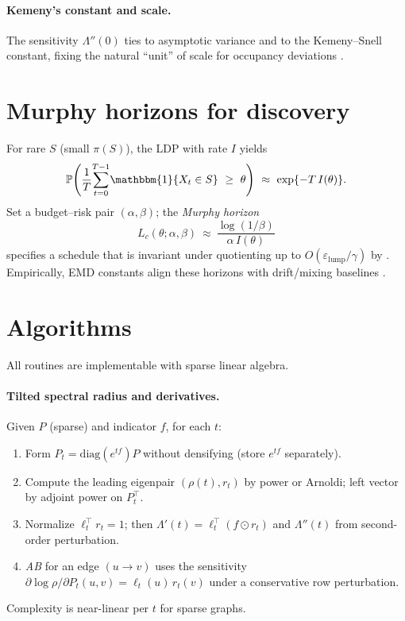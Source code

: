 \documentclass[11pt]{article}
\newcommand{\Prob}{\mathbb{P}}
\newcommand{\1}{\mathbbm{1}}
\begin{document}
\paragraph{Kemeny’s constant and scale.}
The sensitivity $\Lambda''(0)$ ties to asymptotic variance and to the Kemeny–Snell constant, fixing the natural “unit” of scale for occupancy deviations \parencite{KemenySnell1976,LevinPeresWilmer2009}.

\section{Murphy horizons for discovery}\label{sec:murphy}
For rare $S$ (small $\pi(S)$), the LDP with rate $I$ yields
\[
\Prob\!\left(\frac1T\!\sum_{t=0}^{T-1}\!\1\{X_t\in S\}\ \ge \ \theta\right)
\ \approx\ \exp\{-T\,I(\theta)\}.
\]
Set a budget–risk pair $(\alpha,\beta)$; the \emph{Murphy horizon}
\[
L_c(\theta;\alpha,\beta)\ \approx\ \frac{\log(1/\beta)}{\alpha\,I(\theta)}
\]
specifies a schedule that is invariant under quotienting up to $O(\varepsilon_{\mathrm{lump}}/\gamma)$ by . Empirically, EMD constants align these horizons with drift/mixing baselines \parencite{MeynTweedie2009,elliott2025drift,LevinPeresWilmer2009}.

\section{Algorithms}\label{sec:alg}
All routines are implementable with sparse linear algebra.

\paragraph{Tilted spectral radius and derivatives.}
Given $P$ (sparse) and indicator $f$, for each $t$:
\begin{enumerate}[leftmargin=1.25em]
\item Form $P_t=\mathrm{diag}(e^{t f})P$ without densifying (store $e^{t f}$ separately).
\item Compute the leading eigenpair $(\rho(t),r_t)$ by power or Arnoldi; left vector by adjoint power on $P_t^\top$.
\item Normalize $\ell_t^\top r_t=1$; then $\Lambda'(t)=\ell_t^\top (f\odot r_t)$ and $\Lambda''(t)$ from second-order perturbation.
\item \emph{AB} for an edge $(u\!\to\! v)$ uses the sensitivity $\partial\log\rho/\partial P_t(u,v)=\ell_t(u)\,r_t(v)$ under a conservative row perturbation.
\end{enumerate}
Complexity is near-linear per $t$ for sparse graphs.
\end{document}
